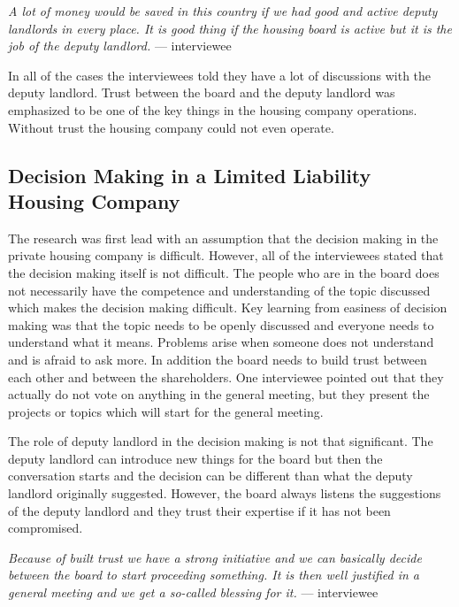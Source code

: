 \begin{displayquote}
\textit{A lot of money would be saved in this country if we had good
and active deputy landlords in every place. It is good thing if the
housing board is active but it is the job of the deputy landlord.} --- interviewee
\end{displayquote}

In all of the cases the interviewees told they have a lot of discussions with the deputy landlord. Trust between the board and the deputy landlord was emphasized to be one of the key things in the housing company operations. Without trust the housing company could not even operate.

\subsection{Decision Making in a Limited Liability Housing Company}

The research was first lead with an assumption that the decision making in the private housing company is difficult. However, all of the interviewees stated that the decision making itself is not difficult. The people who are in the board does not necessarily have the competence and understanding of the topic discussed which makes the decision making difficult. Key learning from easiness of decision making was that the topic needs to be openly discussed and everyone needs to understand what it means. Problems arise when someone does not understand and is afraid to ask more. In addition the board needs to build trust between each other and between the shareholders. One interviewee pointed out that they actually do not vote on anything in the general meeting, but they present the projects or topics which will start for the general meeting.

The role of deputy landlord in the decision making is not that significant. The deputy landlord can introduce new things for the board but then the conversation starts and the decision can be different than what the deputy landlord originally suggested. However, the board always listens the suggestions of the deputy landlord and they trust their expertise if it has not been compromised.

\begin{displayquote}
\textit{Because of built trust we have a strong initiative and we can basically decide between the board to start proceeding something. It is then well justified in a general meeting and we get a so-called blessing for it.} --- interviewee
\end{displayquote}

